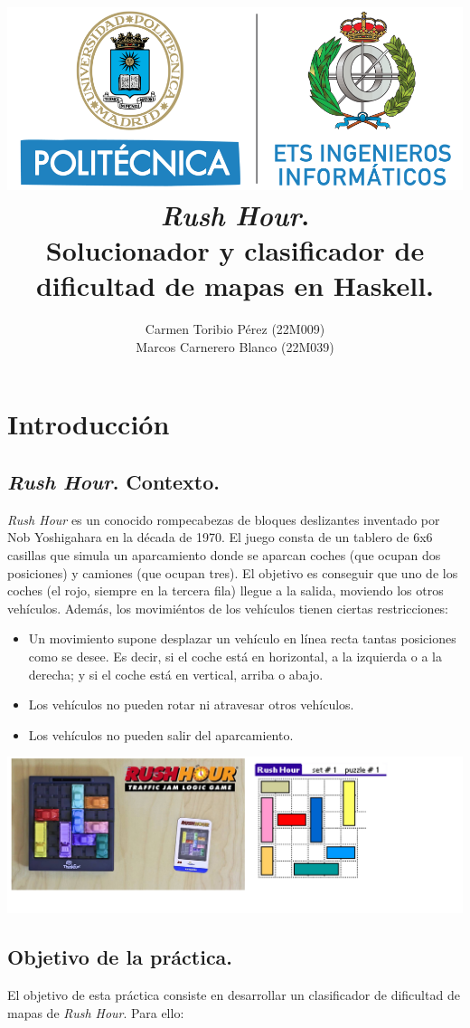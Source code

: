 \documentclass{article}
\title{\includegraphics[scale=0.2]{etsiinf.png}\\[2cm] \textbf{\textit{Rush Hour}.\\Solucionador y clasificador de dificultad de mapas en Haskell.} }
\author{Carmen Toribio Pérez (22M009)\\Marcos Carnerero Blanco (22M039)}
\date{}
\begin{document}
\maketitle

\newpage
\tableofcontents

\newpage
\section{Introducción}
\subsection{\textit{Rush Hour}. Contexto.}
\textit{Rush Hour} es un conocido rompecabezas de bloques deslizantes inventado por Nob Yoshigahara en la década de 1970. El juego consta de un tablero de 6x6 casillas que simula un aparcamiento donde se aparcan coches (que ocupan dos posiciones) y camiones (que ocupan tres). El objetivo es conseguir que uno de los coches (el rojo, siempre en la tercera fila) llegue a la salida, moviendo los otros vehículos. Además, los movimiéntos de los vehículos tienen ciertas restricciones:
\begin{itemize}
  \item Un movimiento supone desplazar un vehículo en línea recta tantas posiciones como se desee. Es decir, si el coche está en horizontal, a la izquierda o a la derecha; y si el coche está en vertical, arriba o abajo.
  \item Los vehículos no pueden rotar ni atravesar otros vehículos.
  \item Los vehículos no pueden salir del aparcamiento.
\end{itemize}

\begin{center}
\includegraphics[scale=0.35]{images/rushhour.png}
\end{center}

\subsection{Objetivo de la práctica.}
El objetivo de esta práctica consiste en desarrollar un clasificador de dificultad de mapas de \textit{Rush Hour}. Para ello:
\end{document}
